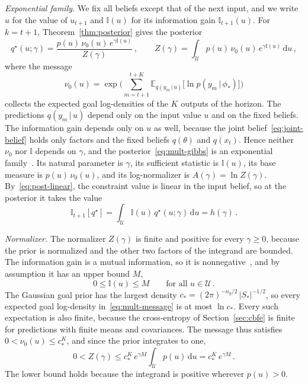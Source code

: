 \documentclass{l4dc2027}
\def\rmd{\mathrm{d}}
\def\cU{\mathcal{U}}
\newcommand\given[1][]{\,#1\vert\,}
\newcommand{\E}{\mathbb{E}}
\newenvironment{proofof}[1]{\par\noindent{\bfseries\upshape Proof of #1\ }}{\jmlrQED}
\begin{document}
\begin{proofof}{Lemma~\ref{lem:multiplier}}
\emph{Exponential family.} We fix all beliefs except that of the next input, and we write $u$ for the value of $u_{t+1}$ and $\mathbb{I}(u)$ for its information gain $\mathbb{I}_{t+1}(u)$. For $k = t+1$, Theorem~\ref{thm:posterior} gives the posterior
\begin{equation}\label{eq:mult-gibbs}
	q^\star(u; \gamma) = \frac{p(u)\, \nu_0(u)\, e^{\gamma \mathbb{I}(u)}}{Z(\gamma)} \, , \qquad Z(\gamma) = \int_{\cU} p(u)\, \nu_0(u)\, e^{\gamma \mathbb{I}(u)}\, \rmd u \, ,
\end{equation}
where the message
\begin{equation}\label{eq:mult-message}
	\nu_0(u) = \exp\bigg( \sum_{m=t+1}^{t+K} \E_{q(y_m \given u)}\big[\ln p(y_m \given \phi_*)\big] \bigg)
\end{equation}
collects the expected goal log-densities of the $K$ outputs of the horizon. The predictions $q(y_m \given u)$ depend only on the input value $u$ and on the fixed beliefs. The information gain depends only on $u$ as well, because the joint belief~\eqref{eq:joint-belief} holds only factors and the fixed beliefs $q(\theta)$ and $q(x_t)$. Hence neither $\nu_0$ nor $\mathbb{I}$ depends on $\gamma$, and the posterior~\eqref{eq:mult-gibbs} is an exponential family~\citep{wainwright2008graphical}. Its natural parameter is $\gamma$, its sufficient statistic is $\mathbb{I}(u)$, its base measure is $p(u)\, \nu_0(u)$, and its log-normalizer is $A(\gamma) = \ln Z(\gamma)$. By~\eqref{eq:post-linear}, the constraint value is linear in the input belief, so at the posterior it takes the value
\begin{equation}\label{eq:mult-h}
	\mathbb{I}_{t+1}[q^\star] = \int_{\cU} \mathbb{I}(u)\, q^\star(u; \gamma)\, \rmd u = h(\gamma) \, .
\end{equation}

\emph{Normalizer.} The normalizer $Z(\gamma)$ is finite and positive for every $\gamma \geq 0$, because the prior is normalized and the other two factors of the integrand are bounded. The information gain is a mutual information, so it is nonnegative~\citep{cover1999elements}, and by assumption it has an upper bound $M$,
\begin{equation}\label{eq:mult-info-bounds}
	0 \leq \mathbb{I}(u) \leq M \qquad \text{for all } u \in \cU \, .
\end{equation}
The Gaussian goal prior has the largest density $c_* = (2\pi)^{-n_y/2}\, |S_*|^{-1/2}$, so every expected goal log-density in~\eqref{eq:mult-message} is at most $\ln c_*$. Every such expectation is also finite, because the cross-entropy of Section~\ref{sec:cbfe} is finite for predictions with finite means and covariances. The message thus satisfies $0 < \nu_0(u) \leq c_*^K$, and since the prior integrates to one,
\begin{equation}\label{eq:mult-Z}
	0 < Z(\gamma) \leq c_*^K\, e^{\gamma M} \int_{\cU} p(u)\, \rmd u = c_*^K\, e^{\gamma M} \, .
\end{equation}
The lower bound holds because the integrand is positive wherever $p(u) > 0$.


\end{proofof}
\end{document}
